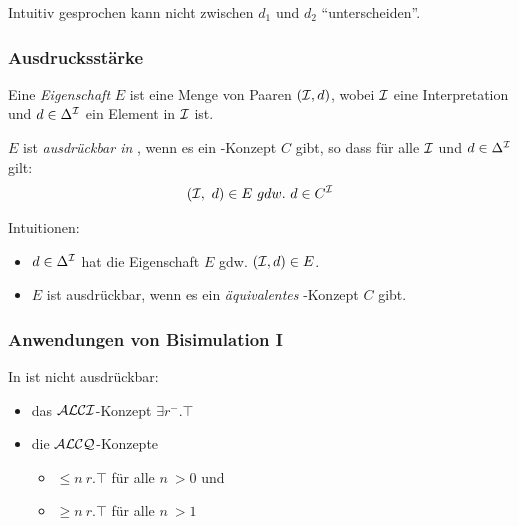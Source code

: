 Intuitiv gesprochen kann \ALC nicht zwischen $d_1$ und $d_2$ \enquote{unterscheiden}.

\subsubsection{Ausdrucksstärke}\label{ausdrucksstuxe4rke}

\begin{definition}

Eine \emph{Eigenschaft} $E$ ist eine Menge von Paaren $(\mathcal{I},d)$, wobei
$\mathcal{I}$ eine Interpretation und $d \in \Delta^{\mathcal{I}}$ ein Element in $\mathcal{I}$ ist.

$E$ ist \emph{ausdrückbar in \ALC}, wenn es ein \ALC-Konzept $C$
gibt, so dass für alle $\mathcal{I}$ und $d \in \Delta^{\mathcal{I}}$ gilt: \begin{align*}
\left( \MI,\ d \right) \in E\ gdw.\ d \in C^\MI
\end{align*}
\end{definition}

Intuitionen:
\begin{itemize}
    \item $d \in \Delta^{\mathcal{I}}$ hat die Eigenschaft $E$ gdw. $(\mathcal{I}, d) \in E$.
    \item $E$ ist ausdrückbar, wenn es ein \emph{äquivalentes} \ALC-Konzept $C$ gibt.
\end{itemize}

\subsubsection{Anwendungen von Bisimulation I}\label{theorem-3.4}

\begin{theorem}
    \label{thm:beschraenkt}
In \ALC ist nicht ausdrückbar: 
\begin{itemize}
\item das $\mathcal{A}\mathcal{L}\mathcal{C}\mathcal{I}$-Konzept $\exists r^{-}.\top$ 
\item die $\mathcal{A}\mathcal{L}\mathcal{C}\mathcal{Q}$-Konzepte
\begin{itemize}
  \item $\leq n\ r.\top$ für alle $n\ > 0$ und
  \item $\geq n\ r.\top$ für alle $n\ > 1$
\end{itemize}
\end{itemize}
\end{theorem}


